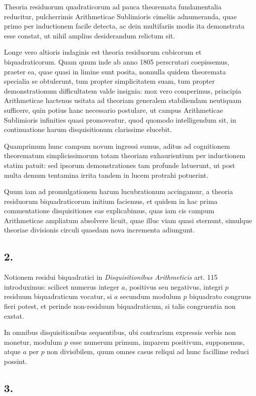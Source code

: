 \documentclass[12pt]{article}
\begin{document}
Theoria residuorum quadraticorum ad pauca theoremata fundamentalia reducitur, pulcherrimis Arithmeticae Sublimioris cimeliis adnumeranda, quae primo per inductionem facile detecta, ac dein multifariis modis ita demonstrata esse constat, ut nihil amplius desiderandum relictum sit.

Longe vero altioris indaginis est theoria residuorum cubicorum et biquadraticorum. Quam quum inde ab anno 1805 perscrutari coepissemus, praeter ea, quae quasi in limine sunt posita, nonnulla quidem theoremata specialia se obtulerunt, tum propter simplicitatem suam, tum propter demonstrationum difficultatem valde insignia: mox vero comperimus, principia Arithmeticae hactenus usitata ad theoriam generalem stabiliendam neutiquam sufficere, quin potius hanc necessario postulare, ut campus Arithmeticae Sublimioris infinities quasi promoveatur, quod quomodo intelligendum sit, in continuatione harum disquisitionum clarissime elucebit.

Quamprimum hunc campum novum ingressi sumus, aditus ad cognitionem theorematum simplicissimorum totam theoriam exhaurientium per inductionem statim patuit: sed ipsorum demonstrationes tam profunde latuerunt, ut post multa demum tentamina irrita tandem in lucem protrahi potuerint.

Quum iam ad promulgationem harum lucubrationum accingamur, a theoria residuorum biquadraticorum initium faciemus, et quidem in hac prima commentatione disquisitiones eas explicabimus, quas iam cis campum Arithmeticae ampliatum absolvere licuit, quae illuc viam quasi sternunt, simulque theoriae divisionis circuli quaedam nova incrementa adiungunt.

\subsection*{2.}

Notionem residui biquadratici in \emph{Disquisitionibus Arithmeticis} art. 115 introduximus: scilicet numerus integer $a$, positivus seu negativus, integri $p$ residuum biquadraticum vocatur, si $a$ secundum modulum $p$ biquadrato congruus fieri potest, et perinde non-residuum biquadraticum, si talis congruentia non exstat.

In omnibus disquisitionibus sequentibus, ubi contrarium expressis verbis non monetur, modulum $p$ esse numerum primum, imparem positivum, supponemus, atque $a$ per $p$ non divisibilem, quum omnes casus reliqui ad hunc facillime reduci possint.

\subsection*{3.}
\end{document}
